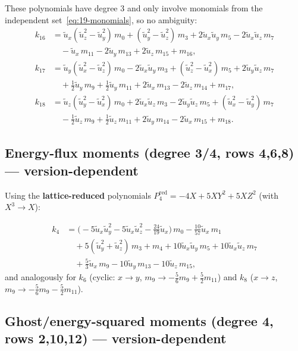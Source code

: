 \documentclass[11pt,a4paper]{article}
\newcommand{\tu}{\tilde{u}}
\begin{document}
These polynomials have degree 3 and only involve monomials from the independent set~\eqref{eq:19-monomials}, so no ambiguity:
\begin{align}
  k_{16} &= \tu_x(\tu_z^2 - \tu_y^2)\,m_0 + (\tu_y^2 - \tu_z^2)\,m_3 + 2\tu_x\tu_y\,m_5 - 2\tu_x\tu_z\,m_7 \nonumber\\
  &\quad - \tu_x\,m_{11} - 2\tu_y\,m_{13} + 2\tu_z\,m_{15} + m_{16}, \label{eq:k16}\\[6pt]
  k_{17} &= \tu_y(\tu_x^2 - \tu_z^2)\,m_0 - 2\tu_x\tu_y\,m_3 + (\tu_z^2 - \tu_x^2)\,m_5 + 2\tu_y\tu_z\,m_7 \nonumber\\
  &\quad + \tfrac{1}{2}\tu_y\,m_9 + \tfrac{1}{2}\tu_y\,m_{11} + 2\tu_x\,m_{13} - 2\tu_z\,m_{14} + m_{17}, \label{eq:k17}\\[6pt]
  k_{18} &= \tu_z(\tu_y^2 - \tu_x^2)\,m_0 + 2\tu_x\tu_z\,m_3 - 2\tu_y\tu_z\,m_5 + (\tu_x^2 - \tu_y^2)\,m_7 \nonumber\\
  &\quad - \tfrac{1}{2}\tu_z\,m_9 + \tfrac{1}{2}\tu_z\,m_{11} + 2\tu_y\,m_{14} - 2\tu_x\,m_{15} + m_{18}. \label{eq:k18}
\end{align}

\subsection{Energy-flux moments (degree 3/4, rows 4,6,8) --- \textbf{version-dependent}}

Using the \textbf{lattice-reduced} polynomials $P_4^{\text{red}} = -4X + 5XY^2 + 5XZ^2$ (with $X^3 \to X$):

\begin{align}
  k_4 &= \bigl(-5\tu_x\tu_y^2 - 5\tu_x\tu_z^2 - \tfrac{24}{19}\tu_x\bigr)\,m_0
       - \tfrac{10}{57}\tu_x\,m_1 \nonumber\\
  &\quad + 5(\tu_y^2 + \tu_z^2)\,m_3 + m_4
       + 10\tu_x\tu_y\,m_5 + 10\tu_x\tu_z\,m_7 \nonumber\\
  &\quad + \tfrac{5}{3}\tu_x\,m_9
       - 10\tu_y\,m_{13} - 10\tu_z\,m_{15}, \label{eq:k4}
\end{align}
and analogously for $k_6$ (cyclic: $x \to y$, $m_9 \to -\frac{5}{6}m_9 + \frac{5}{2}m_{11}$) and $k_8$ ($x \to z$, $m_9 \to -\frac{5}{6}m_9 - \frac{5}{2}m_{11}$).

\subsection{Ghost/energy-squared moments (degree 4, rows 2,10,12) --- \textbf{version-dependent}}
\end{document}
